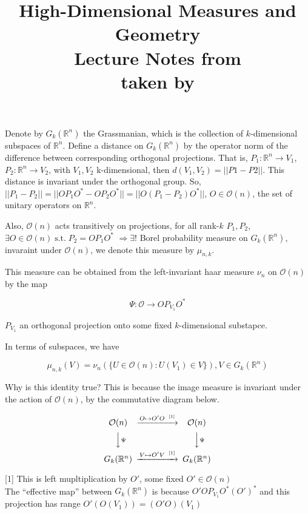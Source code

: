 \documentclass[12pt]{article}
\date{} %
\author{} %
\title{{\bf High-Dimensional Measures and Geometry}\\
Lecture Notes from \lecdat\\[0.1cm] \small taken by \notesby}
\theoremstyle{remark}
\newcommand{\reals}[0] { \mathbb{R}}
\newcommand{\cO}[0] { \mathcal{O} } %
\newcommand{\st}[0]{ \; \textrm{s.t.} \; }
\newcommand{\rimply}[0] { \Rightarrow }
\newcommand{\rarw}[0] { \rightarrow }
\begin{document}
\maketitle



Denote by $G_k( \reals^n )$ the Grassmanian, which is the collection of $k$-dimensional subspaces of $\reals^n$.
Define a distance on $G_k( \reals^n )$ by the operator norm of the difference between corresponding orthogonal projections.
That is, $P_1 : \reals^n \rarw V_1$, $P_2 : \reals^n \rarw V_2$, with $V_1, V_2$ k-dimensional, then $d(V_1, V_2) = ||P1-P2||$.
This distance is invariant under the orthogonal group. So, $||P_1-P_2|| = ||  O P_1 O^* - O P_2 O^* || = ||  O (P_1 - P_2) O^* ||$, $O \in \cO(n)$, the set of unitary operators on $\reals^n$.

Also, $\cO(n)$ acts transitively on projections, for all rank-$k$ $P_1, P_2$, $\exists O \in \cO(n) \st P_2 = O P_1 O^*$ $\rimply \exists !$ Borel probability measure on $G_k( \reals^n )$, invaraint under $\cO(n)$, we denote this measure by $\mu_{n,k}$.

This measure can be obtained from the left-invariant haar measure $\nu_n$ on $\cO(n)$ by the map

$$
    \Psi: \cO \rarw O P_{V_1} O^*
$$

$P_{V_1}$ an orthogonal projection onto some fixed $k$-dimensional substapce.

In terms of subspaces, we have 

$$
	\mu_{n,k}(V) = \nu_n ( \{  U \in \cO(n): U(V_1) \in V \} ), V \in G_k( \reals^n )
$$

Why is this identity true? This is because the image measure is invariant under the action of $\cO(n)$, by the commutative diagram below.




\begin{equation}
\begin{CD}
\cO(n) @>{ O \mapsto O'O \; \; ^{[1]}  }>> \cO(n) \\
@VV{ \Psi }V         @VV{\Psi  }V \\
G_k(\reals^n) @>{ V \mapsto O' V  \; \; ^{[1]} }>> G_k(\reals^n)
\end{CD}
\end{equation}

[1] This is left mupltiplication by $O'$, some fixed $O' \in \cO(n)$\\

The ``effective map'' between $G_k( \reals^n)$ is because $ O'O P_{V_1} O^*(O')^*$ and this projection has range $ O'(O(V_1)) = (O'O)(V_1)$
\end{document}
